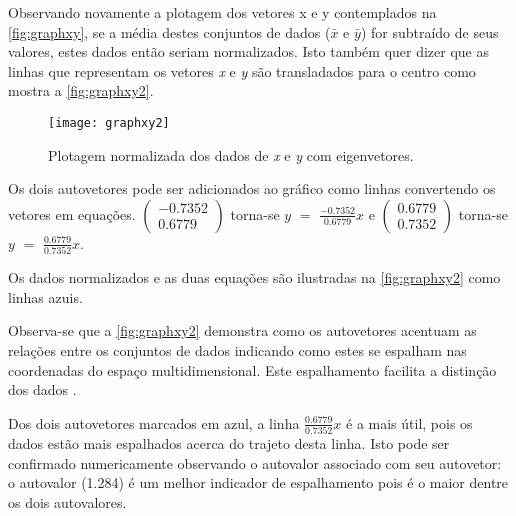 \begin{comment}
$\begin{pmatrix} 0.6779 \\ 0.7352 \end{pmatrix}$  e 1.284
\end{center}

Ambos os eigenvetores possuem unidade de tamanho.


\subsubsection{Utilizando Eigenfaces como Componente Principal}\label{subsec:eigenacp}
\end{comment}


Observando novamente a plotagem dos vetores x e y contemplados na \autoref{fig:graphxy}, se a média destes conjuntos de dados ($\bar{x}$ e $\bar{y}$) for subtraído de seus valores, estes dados então seriam normalizados. Isto também quer dizer que as linhas que representam os vetores \textit{x} e \textit{y} são transladados para o centro como mostra a \autoref{fig:graphxy2}. 

\begin{figure}[h]
	\centering
	\texttt{[image: graphxy2]}
	\caption{Plotagem normalizada dos dados de \textit{x} e \textit{y} com eigenvetores.}
	\label{fig:graphxy2}
\end{figure}

Os dois autovetores pode ser adicionados ao gráfico como linhas convertendo os vetores em equações. 
$\begin{pmatrix} -0.7352 \\ 0.6779 \end{pmatrix}$ torna-se $y$ $=$ $\frac{-0.7352}{0.6779}$$x$  e $\begin{pmatrix} 0.6779 \\ 0.7352 \end{pmatrix}$ torna-se $y$ $=$ $\frac{0.6779}{0.7352}$$x$.

Os dados normalizados e as duas equações são ilustradas na \autoref{fig:graphxy2} como linhas azuis. 

Observa-se que a \autoref{fig:graphxy2} demonstra como os autovetores acentuam as relações entre os conjuntos de dados indicando como estes se espalham nas coordenadas do espaço multidimensional. Este espalhamento facilita a distinção dos dados \cite{drmathew_java_programming}.

Dos dois autovetores marcados em azul, a linha $\frac{0.6779}{0.7352}$$x$ é a mais útil, pois os dados estão mais espalhados acerca do trajeto desta linha. Isto pode ser confirmado numericamente observando o autovalor associado com seu autovetor: o autovalor (1.284) é um melhor indicador de espalhamento pois é o maior dentre os dois autovalores.


